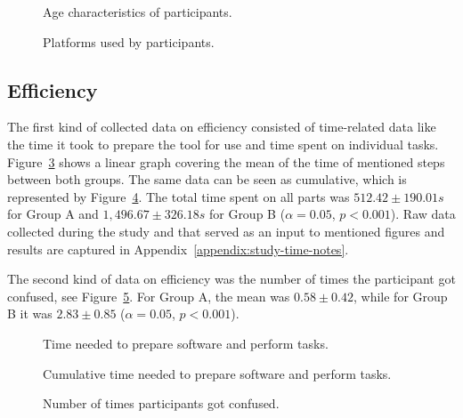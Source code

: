 \begin{figure}[H]
    
    \caption{Age characteristics of participants.}
    \label{fig:plot-age}
\end{figure}

\begin{figure}[H]
    
    \caption{Platforms used by participants.}
    \label{fig:plot-platform}
\end{figure}

\subsection{Efficiency}

The first kind of collected data on efficiency consisted of time-related data like the time it took to prepare the tool for use and time spent on individual tasks.
Figure~\ref{fig:plot-linear} shows a linear graph covering the mean of the time of mentioned steps between both groups.
The same data can be seen as cumulative, which is represented by Figure~\ref{fig:plot-stacked-bar}.
The total time spent on all parts was $512.42 \pm 190.01 s$ for Group A and $1,496.67 \pm 326.18 s$ for Group B ($\alpha=0.05$, $p<0.001$).
Raw data collected during the study and that served as an input to mentioned figures and results are captured in Appendix~\ref{appendix:study-time-notes}.

The second kind of data on efficiency was the number of times the participant got confused, see Figure~\ref{fig:plot-boxplot}.
For Group A, the mean was $0.58 \pm 0.42$, while for Group B it was $2.83 \pm 0.85$ ($\alpha=0.05$, $p<0.001$).

\begin{figure}[H]
    
    \caption{Time needed to prepare software and perform tasks.}
    \label{fig:plot-linear}
\end{figure}

\begin{figure}[H]
    
    \caption{Cumulative time needed to prepare software and perform tasks.}
    \label{fig:plot-stacked-bar}
\end{figure}

\begin{figure}[H]
    
    \caption{Number of times participants got confused.}
    \label{fig:plot-boxplot}
\end{figure}


